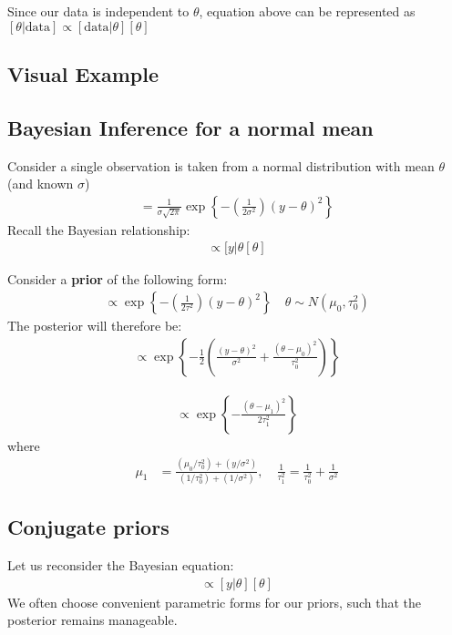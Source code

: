 \documentclass[11pt, oneside, reqno]{amsart}
\numberwithin{equation}{section}
\theoremstyle{plain}%
\theoremstyle{definition}
\theoremstyle{remark}
\begin{document}
Since our data is independent to $\theta$, equation above can be represented as
$[\theta|\text{data}]\propto[\text{data}|\theta][\theta]$

\subsection{Visual Example}


\subsection{Bayesian Inference for a normal mean}
Consider a single observation is taken from a normal distribution with mean $\theta$ (and known $\sigma$)
\begin{align*}
	[y|\theta]=\frac{1}{\sigma\sqrt{2\pi}}\exp\left\{-\left(\frac{1}{2\sigma^2}\right)(y-\theta)^2\right\}
\end{align*}
Recall the Bayesian relationship:
\begin{align*}
	[\theta|y]\propto[y|\theta[\theta]
\end{align*}

Consider a \textbf{prior} of the following form:
\begin{align*}
	[\theta]\propto\exp\left\{-\left(\frac{1}{2\tau^2}\right)(y-\theta)^2\right\}\quad 
	\theta\sim N(\mu_0,\tau^2_0)
\end{align*}
The posterior will therefore be:
\begin{align*}
	[\theta|y]\propto\exp\left\{-\frac{1}{2}\left(\frac{(y-\theta)^2}{\sigma^2}+\frac{(\theta-\mu_0)^2}{\tau^2_0}\right)\right\}
\end{align*}

\begin{align*}
	[\theta|y]\propto\exp\left\{-\frac{(\theta-\mu_1)^2}{2\tau^2_1}\right\}
\end{align*}
where
\begin{align*}
	\mu_1&=\frac{(\mu_0/\tau^2_0)+(y/\sigma^2)}{(1/\tau^2_0)+(1/\sigma^2)},\quad\frac{1}{\tau^2_1}=\frac{1}{\tau^2_0}+\frac{1}{\sigma^2}
\end{align*}
\subsection{Conjugate priors}
Let us reconsider the Bayesian equation:
\begin{align*}
	[\theta|y]\propto[y|\theta][\theta]
\end{align*}
We often choose convenient parametric forms for our priors, such that the posterior remains manageable.
\end{document}
